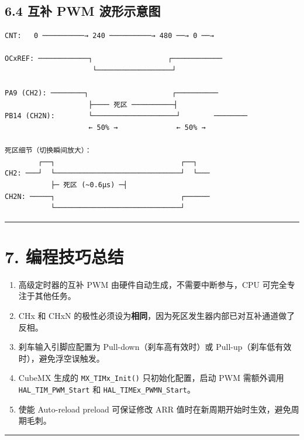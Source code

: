 \documentclass[
  chinese,
  UTF8,
  oneside,
  openany]{ctexbook}
\providecommand{\tightlist}{%
  \setlength{\itemsep}{0pt}\setlength{\parskip}{0pt}}
\begin{document}
\subsection{6.4 互补 PWM
波形示意图}\label{ux4e92ux8865-pwm-ux6ce2ux5f62ux793aux610fux56fe}

\begin{verbatim}
CNT:   0 ──────────→ 240 ──────────→ 480 ──→ 0 ──→

OCxREF: ────────────┐                  ┌────────────
                     └──────────────────┘

PA9 (CH2): ────────┐                    ┌──────────
                    ├──── 死区 ──────────┤
PB14 (CH2N):        └────────────────────┘        ────────
                    ← 50% →              ← 50% →

死区细节（切换瞬间放大）：
        ┌──┐                              ┌──┐
CH2: ───┘  └──────────────────────────────┘  └───
           ├─ 死区 (~0.6μs) ─┤
CH2N: ─────┐                              ┌──────
           └──────────────────────────────┘
\end{verbatim}

\begin{center}\rule{0.5\linewidth}{0.5pt}\end{center}

\section{7. 编程技巧总结}\label{ux7f16ux7a0bux6280ux5de7ux603bux7ed3-5}

\begin{enumerate}
\def\labelenumi{\arabic{enumi}.}
\tightlist
\item
  高级定时器的互补 PWM 由硬件自动生成，不需要中断参与，CPU
  可完全专注于其他任务。
\item
  CHx 和 CHxN
  的极性必须设为\textbf{相同}，因为死区发生器内部已对互补通道做了反相。
\item
  刹车输入引脚应配置为 Pull-down（刹车高有效时）或
  Pull-up（刹车低有效时），避免浮空误触发。
\item
  CubeMX 生成的 \texttt{MX\_TIMx\_Init()} 只初始化配置，启动 PWM
  需额外调用 \texttt{HAL\_TIM\_PWM\_Start} 和
  \texttt{HAL\_TIMEx\_PWMN\_Start}。
\item
  使能 Auto-reload preload 可保证修改 ARR
  值时在新周期开始时生效，避免周期毛刺。
\end{enumerate}

\begin{center}\rule{0.5\linewidth}{0.5pt}\end{center}
\end{document}
